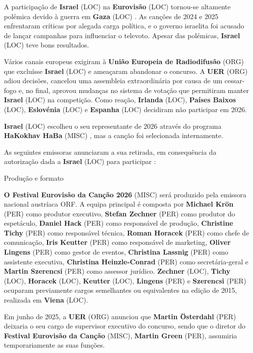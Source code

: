 \documentclass[12pt,a4paper]{article}
\begin{document}
A participação de \textbf{Israel} (LOC) na \textbf{Eurovisão} (LOC) tornou-se altamente polémica devido à guerra em \textbf{Gaza} (LOC) . As canções de 2024 e 2025 enfrentaram críticas por alegada carga política, e o governo israelita foi acusado de lançar campanhas para influenciar o televoto. Apesar das polémicas, \textbf{Israel} (LOC) teve bons resultados.

Vários canais europeus exigiram à \textbf{União Europeia de Radiodifusão} (ORG) que excluísse \textbf{Israel} (LOC) e ameaçaram abandonar o concurso. A \textbf{UER} (ORG) adiou decisões, cancelou uma assembleia extraordinária por causa de um cessar-fogo e, no final, aprovou mudanças no sistema de votação que permitiram manter \textbf{Israel} (LOC) na competição. Como reação, \textbf{Irlanda} (LOC), \textbf{Países Baixos} (LOC), \textbf{Eslovénia} (LOC) e \textbf{Espanha} (LOC) decidiram não participar em 2026.

\textbf{Israel} (LOC) escolheu o seu representante de 2026 através do programa \textbf{HaKokhav HaBa} (MISC) , mas a canção foi selecionada internamente.

As seguintes emissoras anunciaram a sua retirada, em consequência da autorização dada a \textbf{Israel} (LOC) para participar :



Produção e formato

\textbf{O Festival Eurovisão da Canção 2026} (MISC) será produzido pela emissora nacional austríaca ORF. A equipa principal é composta por \textbf{Michael Krön} (PER) como produtor executivo, \textbf{Stefan Zechner} (PER) como produtor do espetáculo, \textbf{Daniel Hack} (PER) como responsável de produção, \textbf{Christine Tichy} (PER) como responsável técnica, \textbf{Roman Horacek} (PER) como chefe de comunicação, \textbf{Iris Keutter} (PER) como responsável de marketing, \textbf{Oliver Lingens} (PER) como gestor de eventos, \textbf{Christina Lassnig} (PER) como assistente executiva, \textbf{Christina Heinzle-Conrad} (PER) como secretária-geral e \textbf{Martin Szerencsi} (PER) como assessor jurídico. \textbf{Zechner} (LOC), \textbf{Tichy} (LOC), \textbf{Horacek} (LOC), \textbf{Keutter} (LOC), \textbf{Lingens} (PER) e \textbf{Szerencsi} (PER) ocuparam previamente cargos semelhantes ou equivalentes na edição de 2015, realizada em \textbf{Viena} (LOC).

Em junho de 2025, a \textbf{UER} (ORG) anunciou que \textbf{Martin Österdahl} (PER) deixaria o seu cargo de supervisor executivo do concurso, sendo que o diretor do \textbf{Festival Eurovisão da Canção} (MISC), \textbf{Martin Green} (PER), assumiria temporariamente as suas funções.
\end{document}
